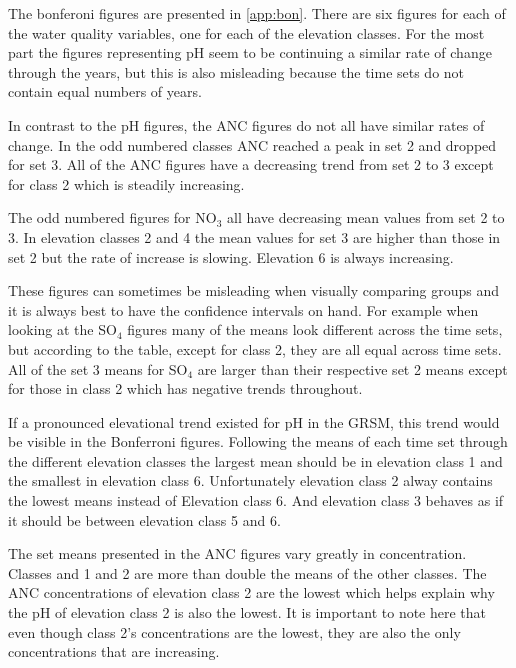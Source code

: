 The bonferoni figures are presented in \autoref{app:bon}.
There are six figures for each of the water quality variables, one for each of the elevation classes.
For the most part the figures representing pH seem to be continuing a similar rate of change through the years, but this is also misleading because the time sets do not contain equal numbers of years.

In contrast to the pH figures, the ANC figures do not all have similar rates of change.
In the odd numbered classes ANC reached a peak in set 2 and dropped for set 3.
All of the ANC figures have a decreasing trend from set 2 to 3 except for class 2 which is steadily increasing.

The odd numbered figures for NO$_3$ all have decreasing mean values from set 2 to 3.
In elevation classes 2 and 4 the mean values for set 3 are higher than those in set 2 but the rate of increase is slowing.
Elevation 6 is always increasing.

These figures can sometimes be misleading when visually comparing groups and it is always best to have the confidence intervals on hand.
For example when looking at the SO$_4$ figures many of the means look different across the time sets, but according to the table, except for class 2, they are all equal across time sets.
All of the set 3 means for SO$_4$ are larger than their respective set 2 means except for those in class 2 which has negative trends throughout.

If a pronounced elevational trend existed for pH in the GRSM, this trend would be visible in the Bonferroni figures.
Following the means of each time set through the different elevation classes the largest mean should be in elevation class 1 and the smallest in elevation class 6.
Unfortunately elevation class 2 alway contains the lowest means instead of Elevation class 6.
And elevation class 3 behaves as if it should be between elevation class 5 and 6.

The set means presented in the ANC figures vary greatly in concentration.
Classes and 1 and 2 are more than double the means of the other classes.
The ANC concentrations of elevation class 2 are the lowest which helps explain why the pH of elevation class 2 is also the lowest.
It is important to note here that even though class 2's concentrations are the lowest, they are also the only concentrations that are increasing.


